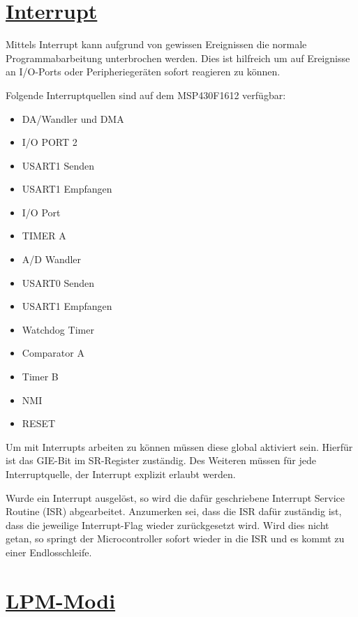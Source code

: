 \documentclass[11pt,german]{scrartcl}
\begin{document}
\clearpage
\section*
{\href{http://cst.mi.fu-berlin.de/intern/19606-P-MPP/Aufgaben/040400.html}
{Interrupt}}

Mittels Interrupt kann aufgrund von gewissen Ereignissen die normale Programmabarbeitung unterbrochen werden.
Dies ist hilfreich um auf Ereignisse an I/O-Ports oder Peripheriegeräten sofort reagieren zu können.

Folgende Interruptquellen sind auf dem MSP430F1612 verfügbar:

\begin{itemize}
    \item DA/Wandler und DMA
    \item I/O PORT 2
    \item USART1 Senden
    \item USART1 Empfangen
    \item I/O Port
    \item TIMER A
    \item A/D Wandler
    \item USART0 Senden
    \item USART1 Empfangen
    \item Watchdog Timer
    \item Comparator A
    \item Timer B
    \item NMI
    \item RESET
\end{itemize}

Um mit Interrupts arbeiten zu können müssen diese global aktiviert sein.
Hierfür ist das GIE-Bit im SR-Register zuständig.
Des Weiteren müssen für jede Interruptquelle, der Interrupt explizit erlaubt werden.

Wurde ein Interrupt ausgelöst, so wird die dafür geschriebene Interrupt Service Routine (ISR) abgearbeitet. Anzumerken sei, dass die ISR dafür zuständig ist, dass die jeweilige Interrupt-Flag wieder zurückgesetzt wird.
Wird dies nicht getan, so springt der Microcontroller sofort wieder in die ISR und es kommt zu einer Endlosschleife.





\clearpage
\section*
{\href{http://cst.mi.fu-berlin.de/intern/19606-P-MPP/Aufgaben/040500.html}
{LPM-Modi}}
\end{document}
